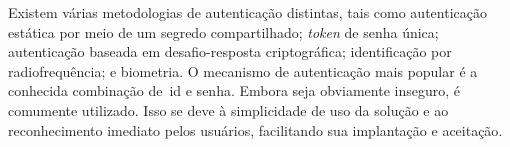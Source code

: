 Existem várias metodologias de autenticação distintas,
tais como autenticação estática por meio de um segredo compartilhado;
\textit{token} de senha única; autenticação baseada em desafio-resposta criptográfica;
identificação por radiofrequência; e biometria.
O mecanismo de autenticação mais popular é a conhecida combinação de~\acrfull{id} e senha.
Embora seja obviamente inseguro, é comumente utilizado.
Isso se deve à simplicidade de uso da solução e ao reconhecimento imediato pelos
usuários, facilitando sua implantação e aceitação\cite{idrus2013}.




